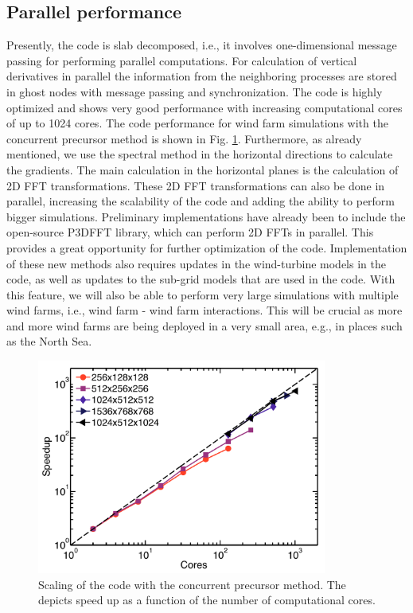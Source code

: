 \documentclass[output=paper,colorlinks,citecolor=brown]{langscibook}
\begin{document}
\subsection{Parallel performance} 
Presently, the code is slab decomposed, i.e., it involves one-dimensional message passing for performing parallel computations. {\color{red} For calculation of vertical derivatives in parallel the information from the neighboring processes are stored in ghost nodes with message passing and synchronization.} The code is highly optimized and shows very good performance with increasing computational cores of up to 1024 cores. The code performance for wind farm simulations with the concurrent precursor method is shown in Fig. \ref{fig1}. Furthermore, as already mentioned, we use the spectral method in the horizontal directions to calculate the gradients. The main calculation in the horizontal planes is the calculation of 2D FFT transformations. These 2D FFT transformations can also be done in parallel, increasing the scalability of the code and adding the ability to perform bigger simulations. Preliminary implementations have already been to include the open-source P3DFFT library, which can perform 2D FFTs in parallel. This provides a great opportunity for further optimization of the code. Implementation of these new methods also requires updates in the wind-turbine models in the code, as well as updates to the sub-grid models that are used in the code. With this feature, we will also be able to perform very large simulations with multiple wind farms, i.e., wind farm - wind farm interactions. This will be crucial as more and more wind farms are being deployed in a very small area, e.g., in places such as the North Sea. 

\begin{figure}[ht!]
  \includegraphics[width=0.85\textwidth]{scaling}
  \caption{Scaling of the code with the concurrent precursor method. The depicts speed up as a function of the number of computational cores.}
  \label{fig1}
\end{figure}

\printbibliography[heading=subbibliography,notkeyword=this]
\end{document}
